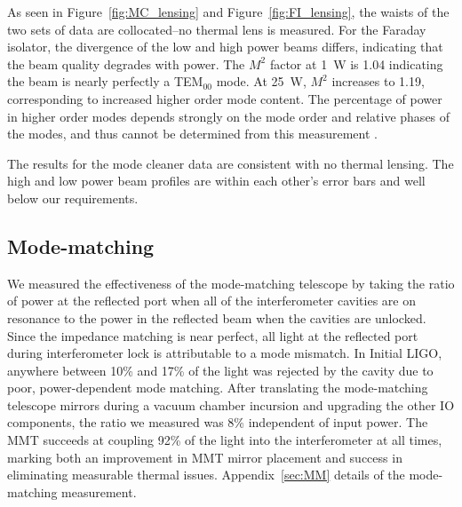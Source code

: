 As seen in Figure~\ref{fig:MC_lensing} and Figure~\ref{fig:FI_lensing}, the
waists of the two sets of data are collocated--no thermal lens is
measured. For the Faraday isolator, the divergence of the low and high
power beams differs, indicating that the beam quality degrades with
power. The $M^2$ factor at 1~W is 1.04 indicating the beam is 
nearly perfectly a TEM$_{00}$ mode. At 25~W, $M^2$ increases to 1.19,
corresponding to increased higher order mode content. The percentage
of power in higher order modes depends strongly on the mode order and
relative phases of the modes, and thus cannot be determined from this
measurement \citep{Kwee2007Laser}.

The results for the mode cleaner data are consistent with no thermal
lensing. The high and low power beam profiles are within each
other's error bars and well below our requirements. 




\subsection{Mode-matching}
We measured the effectiveness of the mode-matching telescope by taking
the ratio of power at the reflected port when all of the
interferometer cavities are on resonance to the power in the reflected
beam when the cavities are unlocked. Since the impedance matching is
near perfect, all light at the reflected port during interferometer
lock is attributable to a mode mismatch. In Initial LIGO, anywhere
between 10\% and 17\% of the light was rejected by the cavity due to
poor, power-dependent mode matching.  After translating the
mode-matching telescope mirrors during a vacuum chamber incursion and
upgrading the other IO components, the ratio we measured was 8\%
independent of input power. The MMT succeeds at coupling 92\% of the
light into the interferometer at all times, marking both an
improvement in MMT mirror placement and success in eliminating
measurable thermal issues. Appendix~\ref{sec:MM} details of the
mode-matching measurement.


